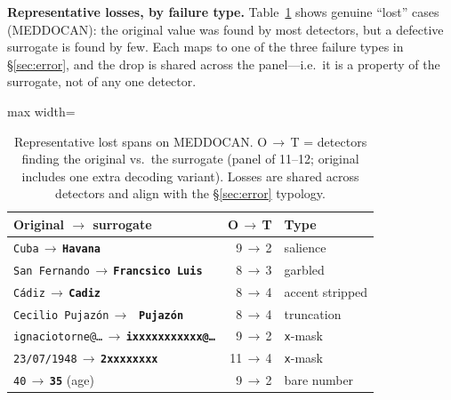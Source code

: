 \documentclass[pmlr,twocolumn,10pt]{jmlr}
\newcommand{\oldv}[1]{\textcolor{cclay}{#1}}
\newcommand{\newv}[1]{\textcolor{caccent}{\textbf{#1}}}
\newcommand{\arr}{\,$\rightarrow$\,\allowbreak}
\newcommand{\tp}[1]{\texttt{#1}}
\begin{document}
\textbf{Representative losses, by failure type.} Table~\ref{tab:lost} shows genuine ``lost'' cases (MEDDOCAN): the original value was found by most detectors, but a defective surrogate is found by few. Each maps to one of the three failure types in \S\ref{sec:error}, and the drop is shared across the panel---i.e.\ it is a property of the surrogate, not of any one detector.

\begin{table}[h]\centering\small
\begin{adjustbox}{max width=\columnwidth}%
\begin{tabular}{p{3.5cm}rl}
\toprule
Original $\rightarrow$ surrogate & O\,$\rightarrow$\,T & Type\\
\midrule
\oldv{\tp{Cuba}}\arr\newv{\tp{Havana}} & 9\,$\rightarrow$\,2 & salience\\
\oldv{\tp{San Fernando}}\arr\newv{\tp{Francsico Luis}} & 8\,$\rightarrow$\,3 & garbled\\
\oldv{\tp{C\'adiz}}\arr\newv{\tp{Cadiz}} & 8\,$\rightarrow$\,4 & accent stripped\\
\oldv{\tp{Cecilio Pujaz\'on}}\arr\newv{\tp{ Pujaz\'on}} & 8\,$\rightarrow$\,4 & truncation\\
\oldv{\tp{ignaciotorne@\dots}}\arr\newv{\tp{ixxxxxxxxxxx@\dots}} & 9\,$\rightarrow$\,2 & \tp{x}-mask\\
\oldv{\tp{23/07/1948}}\arr\newv{\tp{2xxxxxxxx}} & 11\,$\rightarrow$\,4 & \tp{x}-mask\\
\oldv{\tp{40}}\arr\newv{\tp{35}} (age) & 9\,$\rightarrow$\,2 & bare number\\
\bottomrule
\end{tabular}
\end{adjustbox}
\caption{Representative lost spans on MEDDOCAN. O\,$\rightarrow$\,T = detectors finding the original vs.\ the surrogate (panel of 11--12; original includes one extra decoding variant). Losses are shared across detectors and align with the \S\ref{sec:error} typology.}\label{tab:lost}
\end{table}



\end{document}
